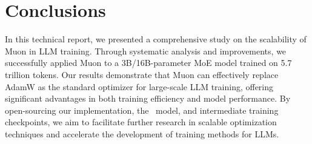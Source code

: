 \section{Conclusions}
In this technical report, we presented a comprehensive study on the scalability of Muon in LLM training. Through systematic analysis and improvements, we successfully applied Muon to a 3B/16B-parameter MoE model trained on 5.7 trillion tokens. Our results demonstrate that Muon can effectively replace AdamW as the standard optimizer for large-scale LLM training, offering significant advantages in both training efficiency and model performance. By open-sourcing our implementation, the \ours~model, and intermediate training checkpoints, we aim to facilitate further research in scalable optimization techniques and accelerate the development of training methods for LLMs.